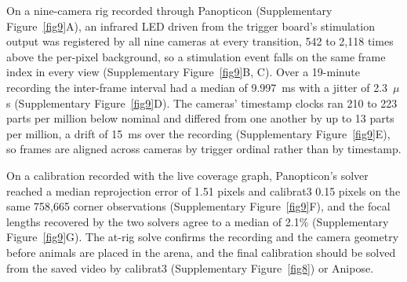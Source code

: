 \documentclass[pdflatex, sn-nature]{sn-jnl}
\theoremstyle{thmstyleone}%
\theoremstyle{thmstyletwo}%
\theoremstyle{thmstylethree}%
\begin{document}
On a nine-camera rig recorded through Panopticon (Supplementary Figure~\ref{fig9}A), an infrared LED driven from the trigger board's stimulation output was registered by all nine cameras at every transition, 542 to 2,118 times above the per-pixel background, so a stimulation event falls on the same frame index in every view (Supplementary Figure~\ref{fig9}B, C). Over a 19-minute recording the inter-frame interval had a median of 9.997~ms with a jitter of 2.3~$\mu$s (Supplementary Figure~\ref{fig9}D). The cameras' timestamp clocks ran 210 to 223 parts per million below nominal and differed from one another by up to 13 parts per million, a drift of 15~ms over the recording (Supplementary Figure~\ref{fig9}E), so frames are aligned across cameras by trigger ordinal rather than by timestamp.

On a calibration recorded with the live coverage graph, Panopticon's solver reached a median reprojection error of 1.51 pixels and calibrat3 0.15 pixels on the same 758,665 corner observations (Supplementary Figure~\ref{fig9}F), and the focal lengths recovered by the two solvers agree to a median of 2.1\% (Supplementary Figure~\ref{fig9}G). The at-rig solve confirms the recording and the camera geometry before animals are placed in the arena, and the final calibration should be solved from the saved video by calibrat3 (Supplementary Figure~\ref{fig8}) or Anipose.
\end{document}
